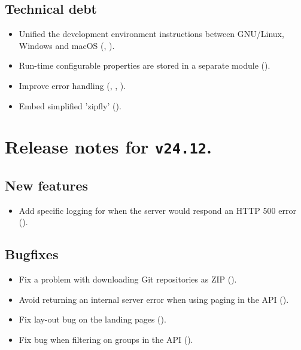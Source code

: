 \subsection*{Technical debt}
\begin{itemize}
  \item{Unified the development environment instructions between GNU/Linux,
      Windows and macOS (,
      ).}
  \item{Run-time configurable properties are stored in a separate module
      ().}
  \item{Improve error handling (,
      ,
      ).}
  \item{Embed simplified 'zipfly' ().}
\end{itemize}

\section*{Release notes for \texttt{v24.12}.}

\subsection*{New features}
\begin{itemize}
  \item{Add specific logging for when the server would respond an HTTP 500 error ().}
\end{itemize}
\subsection*{Bugfixes}
\begin{itemize}
  \item{Fix a problem with downloading Git repositories as ZIP ().}
  \item{Avoid returning an internal server error when using paging in the API ().}
  \item{Fix lay-out bug on the landing pages ().}
  \item{Fix bug when filtering on groups in the API ().}
\end{itemize}
